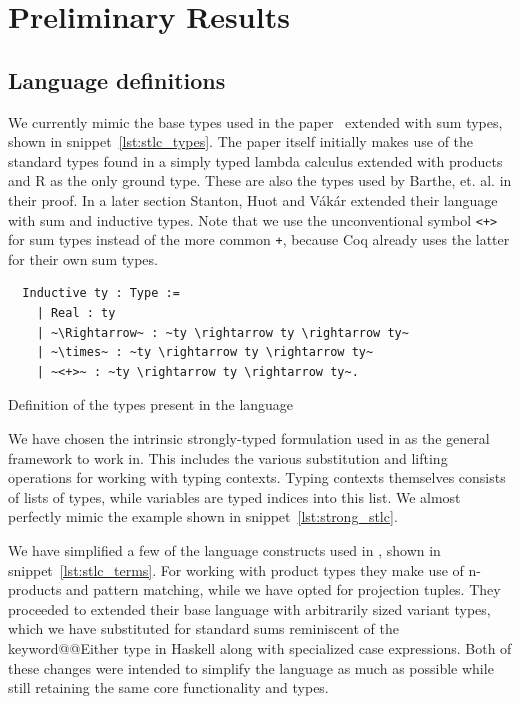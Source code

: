 \documentclass[12pt, final]{article}
\makeatletter
\def\Vakar{V\'{a}k\'{a}r}
\def\<#1>{\csname keyword@@#1\endcsname}
\makeatother
\begin{document}
\section{Preliminary Results}

\subsection{Language definitions}

We currently mimic the base types used in the paper~\cite{huot2020correctness} extended with sum types, shown in snippet~\ref{lst:stlc_types}.
The paper itself initially makes use of the standard types found in a simply typed lambda calculus extended with products and R as the only ground type.
These are also the types used by Barthe, et. al.\cite{barthe2020versatility} in their proof. In a later section Stanton, Huot and \Vakar{} extended their language with sum and inductive types.
Note that we use the unconventional symbol \texttt{<+>} for sum types instead of the more common \texttt{+}, because Coq already uses the latter for their own sum types.

\begin{listing}
  \begin{verbatim}
  Inductive ty : Type :=
    | Real : ty
    | ~\Rightarrow~ : ~ty \rightarrow ty \rightarrow ty~
    | ~\times~ : ~ty \rightarrow ty \rightarrow ty~
    | ~<+>~ : ~ty \rightarrow ty \rightarrow ty~.
  \end{verbatim}
  \caption{Definition of the types present in the language}
  \label{lst:stlc_types}
\end{listing}

We have chosen the intrinsic strongly-typed formulation used in \cite{Benton2011} as the general framework to work in.
This includes the various substitution and lifting operations for working with typing contexts. Typing contexts themselves consists of lists of types, while variables are typed indices into this list. We almost perfectly mimic the example shown in snippet~\ref{lst:strong_stlc}.

We have simplified a few of the language constructs used in \cite{huot2020correctness}, shown in snippet~\ref{lst:stlc_terms}. For working with product types they make use of n-products and pattern matching, while we have opted for projection tuples. They proceeded to extended their base language with arbitrarily sized variant types, which we have substituted for standard sums reminiscent of the \<Either> type in Haskell along with specialized case expressions. Both of these changes were intended to simplify the language as much as possible while still retaining the same core functionality and types.
\end{document}

